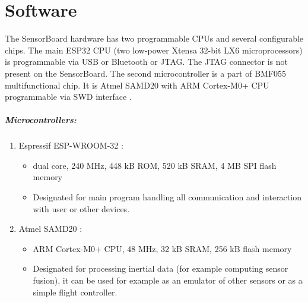 \chapter{Software}
The SensorBoard hardware has two programmable CPUs and several configurable chips. The main ESP32 CPU (two low-power Xtensa 32-bit LX6 microprocessors) \cite{espressif:ESP-WROOM-32} is programmable via USB or Bluetooth or \ac{JTAG}. The \ac{JTAG} connector is not present on the SensorBoard. The second microcontroller is a part of BMF055 \cite{bosch:BMF055} multifunctional chip. It is Atmel SAMD20 \cite{atmel:samd20} with ARM Cortex-M0+ CPU programmable via \ac{SWD} interface \cite{SWDinterface}.

\paragraph{Microcontrollers:}
\begin{enumerate}
    \item Espressif ESP-WROOM-32 \cite{espressif:ESP-WROOM-32}:
    \begin{itemize}
        \item dual core, 240 MHz, 448 kB ROM, 520 kB SRAM, 4 MB SPI flash memory
        \item Designated for main program handling all communication and interaction with user or other devices.
    \end{itemize}
    \item Atmel SAMD20 \cite{atmel:samd20}:
    \begin{itemize}
        \item ARM Cortex-M0+ CPU, 48 MHz, 32 kB SRAM, 256 kB flash memory
        \item Designated for processing inertial data (for example computing sensor fusion), it can be used for example as an emulator of other sensors or as a simple flight controller.
    \end{itemize}
\end{enumerate}

